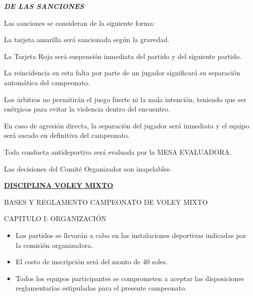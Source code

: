 \documentclass[11pt,a4paper]{article}
\newcommand{\titulo}[1]{\par\medskip\textbf{\textit{#1}}\par}
\newcommand{\capitulo}[1]{\par\medskip #1\par}
\begin{document}
\titulo{DE LAS SANCIONES}
Las sanciones se consideran de la siguiente forma:
\begin{checks}
	\item La tarjeta amarilla será sancionada según la gravedad.
	\item La Tarjeta Roja será suspensión inmediata del partido y del siguiente partido.
	\item La reincidencia en esta falta por parte de un jugador significará su separación automática del campeonato.
	\item Los árbitros no permitirán el juego fuerte ni la mala intención, teniendo que ser enérgicos para evitar la violencia dentro del encuentro.
	\item En caso de agresión directa, la separación del jugador será inmediata y el equipo será sacado en definitiva del campeonato.
	\item Toda conducta antideportiva será evaluada por la MESA EVALUADORA.
	\item Las decisiones del Comité Organizador son inapelables.
\end{checks}

\clearpage
\begin{center}{\large\textbf{\underline{DISCIPLINA VOLEY MIXTO}}}\end{center}

BASES Y REGLAMENTO CAMPEONATO DE VOLEY MIXTO

\capitulo{CAPITULO I: ORGANIZACIÓN}
\begin{itemize}
	\item Los partidos se llevarán a cabo en las instalaciones deportivas indicadas por la comisión organizadora.
	\item El costo de inscripción será del monto de 40 soles.
	\item Todos los equipos participantes se comprometen a aceptar las disposiciones reglamentarias estipuladas para el presente campeonato.
\end{itemize}
\end{document}
